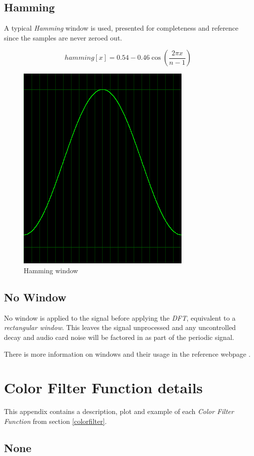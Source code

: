 \documentclass[10pt,a4paper]{report}
\begin{document}
\begin{appendices}
\newpage
\section{Hamming}
A typical \textit{Hamming} window is used, presented for completeness and reference since the samples are never zeroed out.

\begin{equation}
hamming[x] = 0.54 - 0.46\cos(\frac{2\pi x}{n-1})
\end{equation}

\begin{figure}[H]
	\centering
	\includegraphics[width=0.4\linewidth]{plots/window-hamming.png}
	\caption[Hamming window]{Hamming window}
	\label{fig:window-hamming}
\end{figure}


\section{No Window}

No window is applied to the signal before applying the \textit{DFT}, equivalent to a \textit{rectangular window}. This leaves the signal unprocessed and any uncontrolled decay and audio card noise will be factored in as part of the periodic signal.

There is more information on windows and their usage in the reference webpage \cite{windowtypes}.

\chapter{Color Filter Function details}
\label{filterfunctions}

This appendix contains a description, plot and example of each \textit{Color Filter Function} from section \ref{colorfilter}.

\newpage
\section{None} 


\end{appendices}
\end{document}
